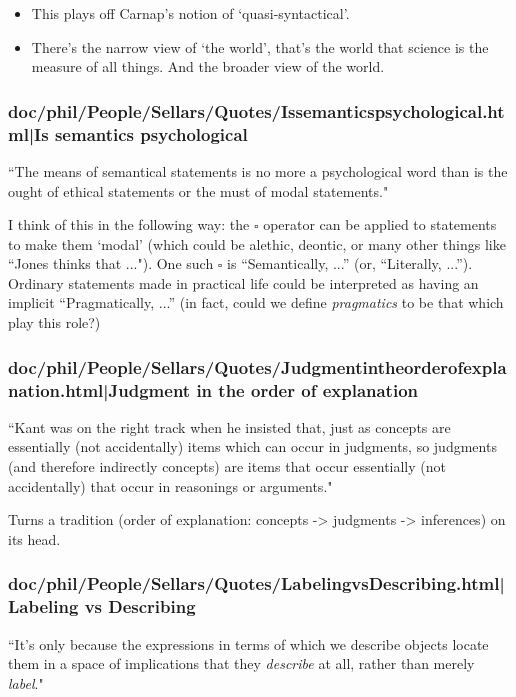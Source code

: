 \documentclass[12pt,a4paper]{report}
\begin{document}
\begin{itemize}
    \item This plays off Carnap's notion of `quasi-syntactical'.
    \item There's the narrow view of `the world', that's the world that science
          is the measure of all things. And the broader view of the world.
\end{itemize}

\subsubsection{doc/phil/People/Sellars/Quotes/Issemanticspsychological.html|Is semantics psychological}
``The means of semantical statements is no more a psychological word than is
the ought of ethical statements or the must of modal statements."

I think of this in the following way: the $\square$ operator can be applied to
statements to make them `modal' (which could be alethic, deontic, or many other
things like ``Jones thinks that ..."). One such $\square$ is ``Semantically,
...'' (or, ``Literally, ...''). Ordinary statements made in practical life
 could be interpreted as having an implicit ``Pragmatically, ...'' (in fact,
 could we define \emph{pragmatics} to be that which play this role?)
\subsubsection{doc/phil/People/Sellars/Quotes/Judgmentintheorderofexplanation.html|Judgment in the order of explanation}

``Kant was on the right track when he insisted that, just as concepts are
essentially (not accidentally) items which can occur in judgments, so judgments
(and therefore indirectly concepts) are items that occur essentially (not
accidentally) that occur in reasonings or arguments."

Turns a tradition (order of explanation: concepts -> judgments -> inferences)
on its head.

\subsubsection{doc/phil/People/Sellars/Quotes/LabelingvsDescribing.html|Labeling vs Describing}
``It's only because the expressions in terms of which we describe objects locate
them in a space of implications that they \emph{describe} at all, rather than
merely \emph{label}."
\end{document}
